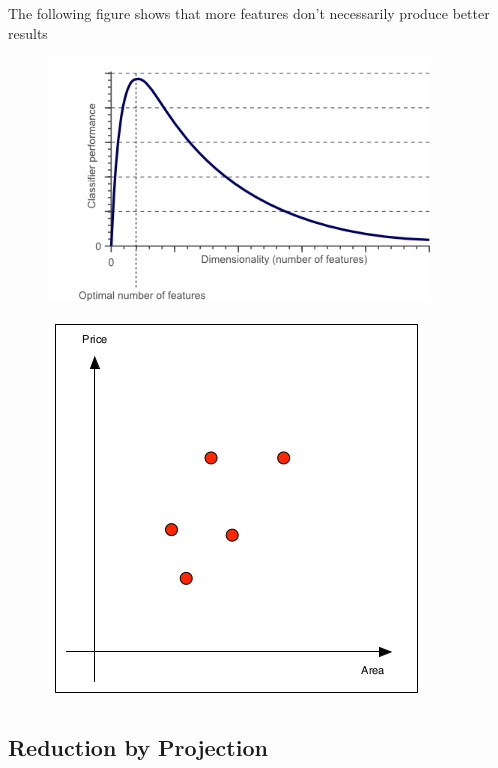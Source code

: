 \documentclass[11pt]{article}
\begin{document}
The following figure shows that more features don't necessarily produce better results

\begin{figure}[htb!]
    \centering
    \includegraphics[keepaspectratio, width=0.9\textwidth]{dimensionality_reduction.png}
\end{figure}

\vspace{10px}

\begin{figure}
    \centering
    \includegraphics[keepaspectratio,height=14\baselineskip]{data_points_2d}
\end{figure}

\subsection{Reduction by Projection}
\end{document}
